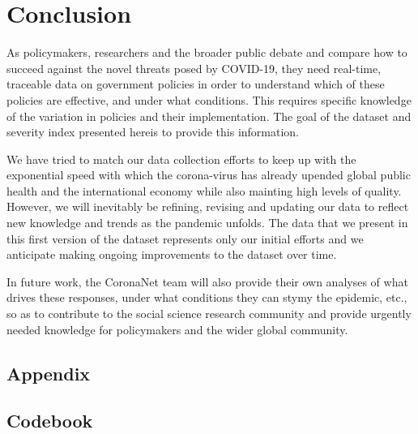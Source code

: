 \documentclass[]{article}
\begin{document}
\hypertarget{conclusion}{%
\section{Conclusion}\label{conclusion}}

As policymakers, researchers and the broader public debate and compare how to succeed against the novel threats posed by COVID-19, they need real-time, traceable data on government policies in order to understand which of these policies are effective, and under what conditions. This requires specific knowledge of the variation in policies and their implementation. The goal of the dataset and severity index presented hereis to provide this information.

We have tried to match our data collection efforts to keep up with the exponential speed with which the corona-virus has already upended global public health and the international economy while also mainting high levels of quality. However, we will inevitably be refining, revising and updating our data to reflect new knowledge and trends as the pandemic unfolds. The data that we present in this first version of the dataset represents only our initial efforts and we anticipate making ongoing improvements to the dataset over time.

In future work, the CoronaNet team will also provide their own analyses of what drives these responses, under what conditions they can stymy the epidemic, etc., so as to contribute to the social science research community and provide urgently needed knowledge for policymakers and the wider global community.

\hypertarget{appendix}{%
\subsection*{Appendix}\label{appendix}}

\hypertarget{codebook}{%
\subsection*{Codebook}\label{codebook}}
\end{document}
